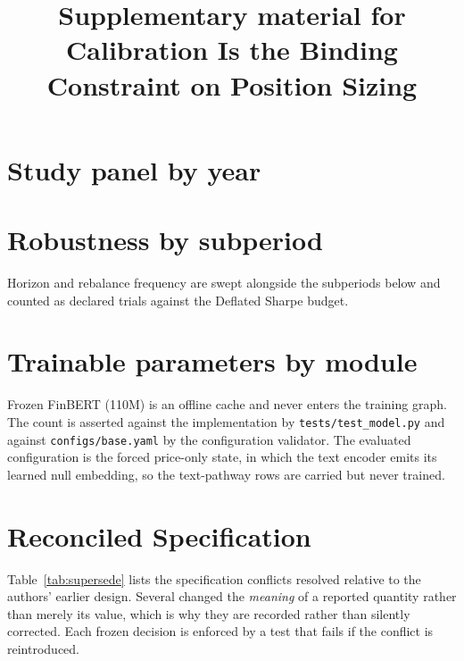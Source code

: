 \documentclass[10pt,a4paper]{article}
\title{\bfseries Supplementary material for\\
Calibration Is the Binding Constraint on Position Sizing}
\date{}
\begin{document}
\maketitle
\appendix

\section{Study panel by year}
\label{app:panel}


\section{Robustness by subperiod}
\label{app:robust}
Horizon and rebalance frequency are swept alongside the subperiods below and
counted as declared trials against the Deflated Sharpe budget.


\section{Trainable parameters by module}
\label{app:params}
Frozen FinBERT (110M) is an offline cache and never enters the training graph.
The count is asserted against the implementation by \texttt{tests/test\_model.py}
and against \texttt{configs/base.yaml} by the configuration validator. The
evaluated configuration is the forced price-only state, in which the text encoder
emits its learned null embedding, so the text-pathway rows are carried but never
trained.


\section{Reconciled Specification}
\label{app:supersede}

Table~\ref{tab:supersede} lists the specification conflicts resolved relative
to the authors' earlier design. Several changed the \emph{meaning} of a
reported quantity rather than merely its value, which is why they are recorded
rather than silently corrected. Each frozen decision is enforced by a test that
fails if the conflict is reintroduced.
\end{document}
